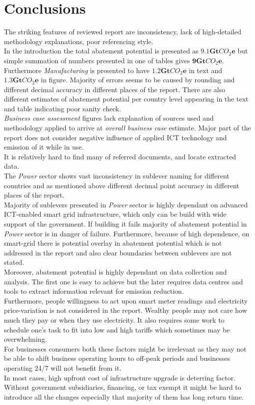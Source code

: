 \documentclass[11pt, twocolumn]{article}
\begin{document}
\section{Conclusions}
The striking features of reviewed report are inconsistency, lack of high-detailed methodology explanations, poor referencing style.\\
In the introduction the total abatement potential is presented as $\mathbf{9.1} \mathbf{Gt}CO_2\mathbf{e}$ but simple summation of numbers presented in one of tables gives $\mathbf{9} \mathbf{Gt}CO_2\mathbf{e}$. Furthermore \emph{Manufacturing} is presented to have $\mathbf{1.2} \mathbf{Gt}CO_2\mathbf{e}$ in text and $\mathbf{1.3} \mathbf{Gt}CO_2\mathbf{e}$ in figure. Majority of errors seems to be caused by rounding and different decimal accuracy in different places of the report. There are also different estimates of abatement potential per country level appearing in the text and table indicating poor sanity check.\\
\emph{Business case assessment} figures lack explanation of sources used and methodology applied to arrive at \emph{overall business case} estimate. Major part of the report does not consider negative influence of applied ICT technology and emission of it while in use.\\
It is relatively hard to find many of referred documents, and locate extracted data.\\

The \emph{Power} sector shows vast inconsistency in sublever naming for different countries and as mentioned above different decimal point accuracy in different places of the report.\\
Majority of sublevers presented in \emph{Power} sector is highly dependant on advanced ICT-enabled smart grid infrastructure, which only can be build with wide support of the government. If building it fails majority of abatement potential in \emph{Power} sector is in danger of failure. Furthermore, because of high dependence, on smart-grid there is potential overlay in abatement potential which is not addressed in the report and also clear boundaries between sublevers are not stated.\\
Moreover, abatement potential is highly dependant on data collection and analysis. The first one is easy to achieve but the later requires data centres and tools to extract information relevant for emission reduction.\\
Furthermore, people willingness to act upon smart meter readings and electricity price-variation is not considered in the report. Wealthy people may not care how much they pay or when they use electricity. It also requires some work to schedule one's task to fit into low and high tariffs which sometimes may be overwhelming.\\
For businesses consumers both these factors might be irrelevant as they may not be able to shift business operating hours to off-peak periods and businesses operating 24/7 will not benefit from it.\\

In most cases, high upfront cost of infrastructure upgrade is deterring factor. Without government subsidiaries, financing, or tax exempt it might be hard to introduce all the changes especially that majority of them has long return time.

{}

\end{document}
